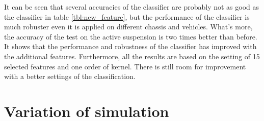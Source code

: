 It can be seen that several accuracies of the classifier are probably not as good as the classifier in table \ref{tbl:new_feature}, but the performance of the classifier is much robuster even it is applied on different chassis and vehicles.
%
What's more, the accuracy of the test on the active suspension is two times better than before.
%
It shows that the performance and robustness of the classifier has improved with the additional features.
%
Furthermore, all the results are based on the setting of 15 selected features and one order of kernel.
%
There is still room for improvement with a better settings of the classification.

 
\section{Variation of simulation}


